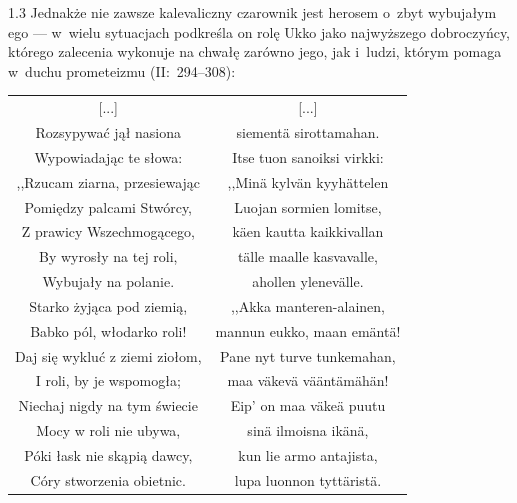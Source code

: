 \documentclass[11pt,a4paper,twoside]{report}
\begin{document}
\begin{spacing}{1.3}
Jednakże nie zawsze kalevaliczny czarownik jest herosem o~zbyt wybujałym ego --- w~wielu sytuacjach podkreśla on rolę Ukko jako najwyższego dobroczyńcy, którego zalecenia wykonuje na chwałę zarówno jego, jak i~ludzi, którym pomaga w~duchu prometeizmu (II:~294--308):
\end{spacing}
{\centering
\small
\begin{longtable}{c c}
[...] & [...]\\
Rozsypywać jął nasiona & siementä sirottamahan. \\
Wypowiadając te słowa: & Itse tuon sanoiksi virkki: \\
,,Rzucam ziarna, przesiewając & ,,Minä kylvän kyyhättelen \\
Pomiędzy palcami Stwórcy, & Luojan sormien lomitse, \\
Z prawicy Wszechmogącego, & käen kautta kaikkivallan \\
By wyrosły na tej roli, & tälle maalle kasvavalle, \\
Wybujały na polanie. & ahollen ylenevälle. \\
Starko żyjąca pod ziemią, & ,,Akka manteren-alainen, \\
Babko pól, włodarko roli! & mannun eukko, maan emäntä! \\
Daj się wykluć z ziemi ziołom, & Pane nyt turve tunkemahan, \\
I roli, by je wspomogła; & maa väkevä vääntämähän! \\
Niechaj nigdy na tym świecie & Eip' on maa väkeä puutu \\
Mocy w roli nie ubywa, & sinä ilmoisna ikänä, \\
Póki łask nie skąpią dawcy, & kun lie armo antajista, \\
Córy stworzenia obietnic. & lupa luonnon tyttäristä. \\
\end{longtable}
}
\end{document}
